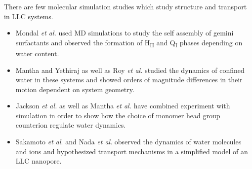   There are few molecular simulation studies which study structure and transport
  in LLC systems.
  \begin{itemize}
    \item Mondal \textit{et al.} used MD simulations to study the self assembly of gemini 
    surfactants and observed the formation of H\textsubscript{II} and Q\textsubscript{I}
    phases depending on water content.\cite{mondal_self-assembly_2013}
    \item Mantha and Yethiraj as well as Roy \textit{et al.} studied the dynamics of confined 
    water in these systems and showed orders of magnitude differences in their motion
    dependent on system geometry.~\cite{mantha_dynamics_2016,roy_water_2016}
    \item Jackson \textit{et al.} as well as Mantha \textit{et al.} have combined experiment with simulation
    in order to show how the choice of monomer head group counterion regulate water 
    dynamics.~\cite{jackson_ion-specific_2018,mantha_counterion-regulated_2018}
    \item Sakamoto \textit{et al}. and Nada \textit{et al}. observed the dynamics of water molecules
    and ions and hypothesized transport mechanisms in a simplified model of an LLC
    nanopore.~\cite{sakamoto_development_2018,nada_transport_2020}
  \end{itemize}

